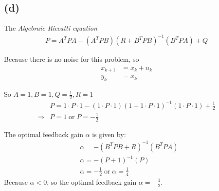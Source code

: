\documentclass[8pt, a4paper, oneside, justified]{article}
\numberwithin{equation}{section}
\begin{document}
\subsection*{(d)}

The \textit{Algebraic Riccatti equation}
\begin{align}
    P = A^TPA-(A^TPB)(R+B^TPB)^{-1}(B^TPA)+Q
\end{align}

Because there is no noise for this problem, so 
\begin{align}
    x_{k+1} & = x_k + u_k \\
    y_k & = x_k
\end{align}

So $A = 1, B = 1, Q = \frac{1}{2}, R = 1$
\begin{align}
    & P = 1\cdot P\cdot 1-(1\cdot P\cdot 1)(1+1\cdot P\cdot 1)^{-1}(1\cdot P\cdot 1)+\frac{1}{2} \\
    \Rightarrow & P = 1 \;\text{or} \;P = -\frac{1}{2}
\end{align}

The optimal feedback gain $\alpha$ is given by:
\begin{align}
    & \alpha = -(B^TPB+R)^{-1}(B^TPA) \\
    & \alpha = -(P + 1)^{-1}(P) \\
    & \alpha = -\frac{1}{2}\;\text{or}\;\alpha = \frac{1}{4}
\end{align}
Because $\alpha<0$, so the optimal feedback gain $\alpha = -\frac{1}{2}$.
\end{document}
